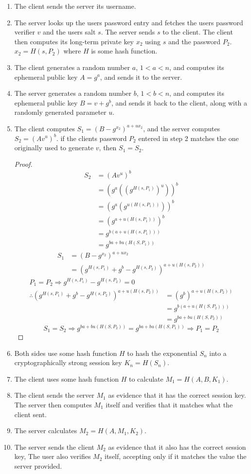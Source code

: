 \documentclass[11pt]{article}
\begin{document}
\begin{enumerate}
\item The client sends the server its username.
\item The server looks up the users password entry and fetches the users password verifier $v$ and the users salt $s$. The server sends $s$ to the client. The client then computes its long-term private key $x_2$ using $s$ and the password $P_2$. $x_2=H(s,P_2)$ where $H$ is some hash function.
\item The client generates a random number $a$, $1<a<n$, and computes its ephemeral public key $A=g^a$, and sends it to the server.
\item The server generates a random number $b$, $1<b<n$, and computes its ephemeral public key $B=v+g^b$, and sends it back to the client, along with a randomly generated parameter $u$.
\item The client computes $S_1=(B-g^{x_2})^{a+ux_2}$, and the server computes $S_2=(Av^u)^b$. if the clients password $P_2$ entered in step 2 matches the one originally used to generate $v$, then $S_1=S_2$.
\begin{proof}
\begin{align*}
S_2&=(Av^u)^b\\
&=(g^a((g^{H(s,P_1)})^u))^b\\
&=(g^a(g^{u(H(s,P_1))}))^b\\
&=(g^{a+u(H(s,P_1))})^b\\
&=g^{b(a+u(H(s,P_1)))}\\
&=g^{ba+bu(H(S,P_1))}
\end{align*}
\begin{align*}
S_1&=(B-g^{x_2})^{a+ux_2}\\
&=(g^{H(s,P_1)}+g^b-g^{H(s,P_2)})^{a+u(H(s,P_2))}
\end{align*}
\begin{align*}
P_1=P_2 \Longrightarrow g^{H(s,P_1)}-g^{H(s,P_2)}=0\\
\therefore (g^{H(s,P_1)}+g^b-g^{H(s,P_2)})^{a+u(H(s,P_2))}&=(g^b)^{a+u(H(s,P_2))}\\
&=g^{b(a+u(H(S,P_2)))}\\
&=g^{ba+bu(H(S,P_2))}
\end{align*}
$$S_1=S_2 \Longrightarrow g^{ba+bu(H(S,P_2))}=g^{ba+bu(H(S,P_1))} \Longrightarrow P_1=P_2$$
\end{proof}
\item Both sides use some hash function $H$ to hash the exponential $S_n$ into a cryptographically strong session key $K_n=H(S_n)$.
\item The client uses some hash function $H$ to calculate $M_1=H(A,B,K_1)$.
\item The client sends the server $M_1$ as evidence that it has the correct session key. The server then computes $M_1$ itself and verifies that it matches what the client sent.
\item The server calculates $M_2=H(A,M_1,K_2)$.
\item The server sends the client $M_2$ as evidence that it also has the correct session key, The user also verifies $M_2$ itself, accepting only if it matches the value the server provided.
\end{enumerate}
\end{document}
